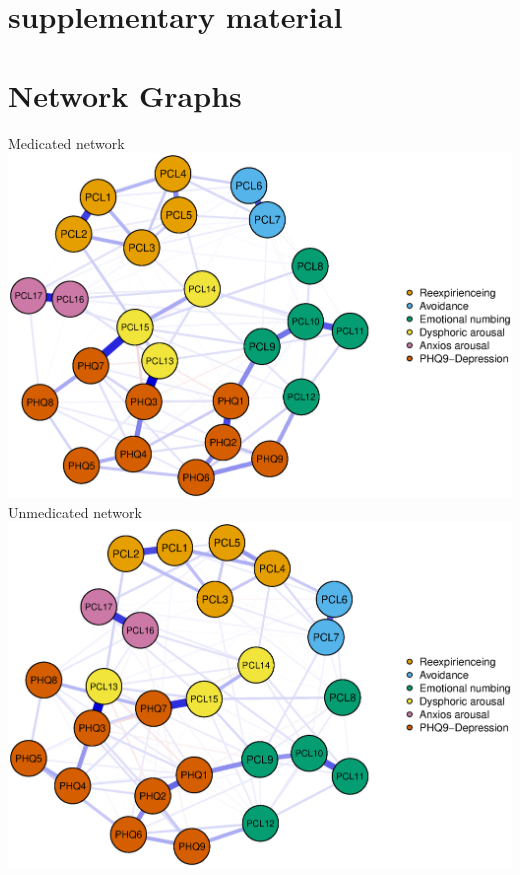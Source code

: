 \documentclass[]{betterposter}
\begin{document}
{\section{supplementary material}
\section{Network Graphs}
\begin{center}
Medicated network
\includegraphics[width=\textwidth]{img/medicated_network.eps}
\\
Unmedicated network
\includegraphics[width=\textwidth]{img/unmedicated_network.eps}
\end{center}

}
\end{document}
